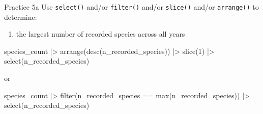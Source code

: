 \documentclass[
  ignorenonframetext,
  aspectratio=169,
  t]{beamer}
\newenvironment{Shaded}{\begin{snugshade}}{\end{snugshade}}
\newcommand{\DecValTok}[1]{\textcolor[rgb]{0.68,0.00,0.00}{#1}}
\newcommand{\FunctionTok}[1]{\textcolor[rgb]{0.28,0.35,0.67}{#1}}
\newcommand{\NormalTok}[1]{\textcolor[rgb]{0.00,0.23,0.31}{#1}}
\newcommand{\SpecialCharTok}[1]{\textcolor[rgb]{0.37,0.37,0.37}{#1}}
\providecommand{\tightlist}{%
  \setlength{\itemsep}{0pt}\setlength{\parskip}{0pt}}
\let\oldtexttt\texttt
\renewcommand{\texttt}[1]{\colorbox{gray!20}{\oldtexttt{#1}}}
\begin{document}
\begin{frame}[fragile]{Practice 5a}
\protect{}\label{practice-5a}
Use \texttt{select()} and/or \texttt{filter()} and/or \texttt{slice()}
and/or \texttt{arrange()} to determine:

\begin{enumerate}
\tightlist
\item
  the largest number of recorded species across all years
\end{enumerate}

\footnotesize

\begin{Shaded}
\begin{Highlighting}[]
\NormalTok{species\_count }\SpecialCharTok{|\textgreater{}} 
    \FunctionTok{arrange}\NormalTok{(}\FunctionTok{desc}\NormalTok{(n\_recorded\_species)) }\SpecialCharTok{|\textgreater{}} 
    \FunctionTok{slice}\NormalTok{(}\DecValTok{1}\NormalTok{) }\SpecialCharTok{|\textgreater{}} 
    \FunctionTok{select}\NormalTok{(n\_recorded\_species)}
\end{Highlighting}
\end{Shaded}

\normalsize

or

\footnotesize

\begin{Shaded}
\begin{Highlighting}[]
\NormalTok{species\_count }\SpecialCharTok{|\textgreater{}} 
    \FunctionTok{filter}\NormalTok{(n\_recorded\_species }\SpecialCharTok{==} \FunctionTok{max}\NormalTok{(n\_recorded\_species)) }\SpecialCharTok{|\textgreater{}} 
    \FunctionTok{select}\NormalTok{(n\_recorded\_species)}
\end{Highlighting}
\end{Shaded}

\normalsize
\end{frame}
\end{document}
